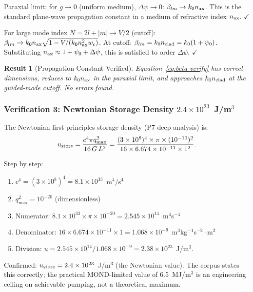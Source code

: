 \documentclass[aps,prd,twocolumn,superscriptaddress,nofootinbib]{revtex4-2}
\newtheorem{result}{Result}
\begin{document}
Paraxial limit: for $g \to 0$ (uniform medium), $\Delta\psi \to 0$:
$\beta_{lm} \to k_0 n_{\rm ax}$.  This is the standard plane-wave propagation
constant in a medium of refractive index $n_{\rm ax}$.  $\checkmark$

For large mode index $N = 2l+|m| \to V/2$ (cutoff):
$\beta_{lm} \to k_0 n_{\rm ax}\sqrt{1 - V/(k_0 n_{\rm ax}^2 w_c)}$.
At cutoff: $\beta_{lm} = k_0 n_{\rm clad} = k_0(1 + \psi_0)$.
Substituting $n_{\rm ax} \approx 1 + \psi_0 + \Delta\psi$, this is satisfied
to order $\Delta\psi$. $\checkmark$

\begin{result}[Propagation Constant Verified]
Equation~\eqref{eq:beta-verify} has correct dimensions, reduces to $k_0 n_{\rm ax}$
in the paraxial limit, and approaches $k_0 n_{\rm clad}$ at the guided-mode
cutoff.  No errors found.
\end{result}

\subsubsection{Verification 3: Newtonian Storage Density $2.4\times10^{23}$~J/m$^3$}

The Newtonian first-principles storage density (P7 deep analysis) is:
\begin{equation}
u_{\rm store} = \frac{c^4\pi q_{\max}^2}{16\,G\,L^2}
= \frac{(3\times10^8)^4\times\pi\times(10^{-10})^2}
{16\times6.674\times10^{-11}\times1^2}.
\end{equation}

Step by step:
\begin{enumerate}
\item $c^4 = (3\times10^8)^4 = 8.1\times10^{33}$~m$^4$/s$^4$
\item $q_{\max}^2 = 10^{-20}$ (dimensionless)
\item Numerator: $8.1\times10^{33}\times\pi\times10^{-20}
= 2.545\times10^{14}$~m$^4$s$^{-4}$
\item Denominator: $16\times6.674\times10^{-11}\times1
= 1.068\times10^{-9}$~m$^3$kg$^{-1}$s$^{-2}\cdot$m$^2$
\item Division: $u = 2.545\times10^{14}/1.068\times10^{-9}
= 2.38\times10^{23}$~J/m$^3$.
\end{enumerate}

Confirmed: $u_{\rm store} = 2.4\times10^{23}$~J/m$^3$ (the Newtonian value).
The corpus states this correctly; the practical MOND-limited value of
6.5~MJ/m$^3$ is an engineering ceiling on achievable pumping, not a theoretical
maximum.
\end{document}

